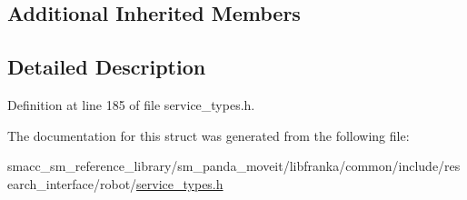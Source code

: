 \subsection*{Additional Inherited Members}


\subsection{Detailed Description}


Definition at line 185 of file service\+\_\+types.\+h.



The documentation for this struct was generated from the following file\+:\begin{DoxyCompactItemize}
\item 
smacc\+\_\+sm\+\_\+reference\+\_\+library/sm\+\_\+panda\+\_\+moveit/libfranka/common/include/research\+\_\+interface/robot/\hyperlink{service__types_8h}{service\+\_\+types.\+h}\end{DoxyCompactItemize}
